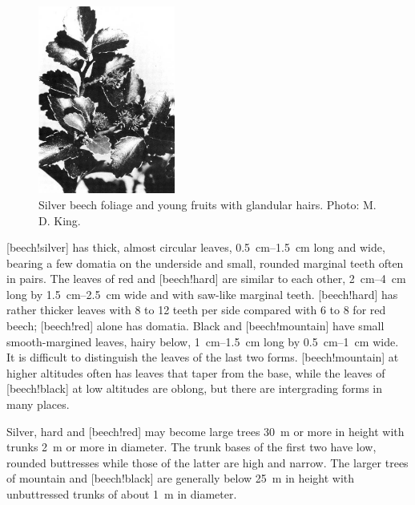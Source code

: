 \begin{figure}
	\includegraphics[width=0.4\textwidth]{graphics/figure69silverbeech.jpg}
	\centering
	\caption[Silver beech foliage and young fruits]{Silver beech foliage and young fruits with glandular hairs.
	Photo: M. D. King.}%
	\label{fig:69silverbeech}
\end{figure}

[beech!silver] has thick, almost circular leaves, \SIrange{0.5}{1.5}{\centi\metre} long and wide, bearing a few domatia on the underside and small, rounded marginal teeth often in pairs.
The leaves of red and [beech!hard] are similar to each other, \SIrange{2}{4}{\centi\metre} long by \SIrange{1.5}{2.5}{\centi\metre} wide and with saw-like marginal teeth.
[beech!hard] has rather thicker leaves with 8 to 12 teeth per side compared with 6 to 8 for red beech; [beech!red] alone has domatia.
Black and [beech!mountain] have small smooth-margined leaves, hairy below, \SIrange{1}{1.5}{\centi\metre} long by \SIrange{0.5}{1}{\centi\metre} wide.
It is difficult to distinguish the leaves of the last two forms.
[beech!mountain] at higher altitudes often has leaves that taper from the base, while the leaves of [beech!black] at low altitudes are oblong, but there are intergrading forms in many places.

Silver, hard and [beech!red] may become large trees \SI{30}{\metre} or more in height with trunks \SI{2}{\metre} or more in diameter.
The trunk bases of the first two have low, rounded buttresses while those of the latter are high and narrow.
The larger trees of mountain and [beech!black] are generally below \SI{25}{\metre} in height with unbuttressed trunks of about \SI{1}{\metre} in diameter.

